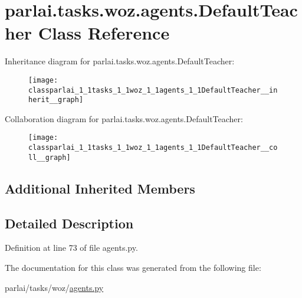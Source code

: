 \hypertarget{classparlai_1_1tasks_1_1woz_1_1agents_1_1DefaultTeacher}{}\section{parlai.\+tasks.\+woz.\+agents.\+Default\+Teacher Class Reference}
\label{classparlai_1_1tasks_1_1woz_1_1agents_1_1DefaultTeacher}


Inheritance diagram for parlai.\+tasks.\+woz.\+agents.\+Default\+Teacher\+:
\nopagebreak
\begin{figure}[H]
\begin{center}
\leavevmode
\texttt{[image: classparlai\_1\_1tasks\_1\_1woz\_1\_1agents\_1\_1DefaultTeacher\_\_inherit\_\_graph]}
\end{center}
\end{figure}


Collaboration diagram for parlai.\+tasks.\+woz.\+agents.\+Default\+Teacher\+:
\nopagebreak
\begin{figure}[H]
\begin{center}
\leavevmode
\texttt{[image: classparlai\_1\_1tasks\_1\_1woz\_1\_1agents\_1\_1DefaultTeacher\_\_coll\_\_graph]}
\end{center}
\end{figure}
\subsection*{Additional Inherited Members}


\subsection{Detailed Description}


Definition at line 73 of file agents.\+py.



The documentation for this class was generated from the following file\+:\begin{DoxyCompactItemize}
\item 
parlai/tasks/woz/\hyperlink{parlai_2tasks_2woz_2agents_8py}{agents.\+py}\end{DoxyCompactItemize}
